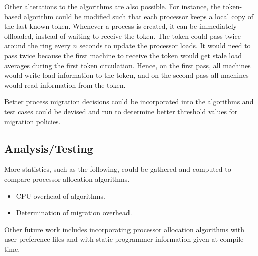 \documentclass{report}
\begin{document}
Other alterations to the algorithms are also possible.  For instance, the
token-based algorithm could be modified such that each processor keeps a
local copy of the last known token.  Whenever a process is created, it can
be immediately offloaded, instead of waiting to receive the token.  The
token could pass twice around the ring every $n$ seconds to update the
processor loads.  It would need to pass twice because the first machine to
receive the token would get stale load averages during the first token
circulation.  Hence, on the first pass, all machines would write load
information to the token, and on the second pass all machines would read
information from the token.

Better process migration decisions could be incorporated into the algorithms
and test cases could be devised and run to determine better threshold values
for migration policies.

\subsection{Analysis/Testing}

More statistics, such as the following, could be gathered and computed to
compare processor allocation algorithms.
\begin{itemize}
	\item CPU overhead of algorithms.
	\item Determination of migration overhead.
\end{itemize}

Other future work includes incorporating processor allocation algorithms
with user preference files and with static programmer information given at
compile time.




\end{document}
